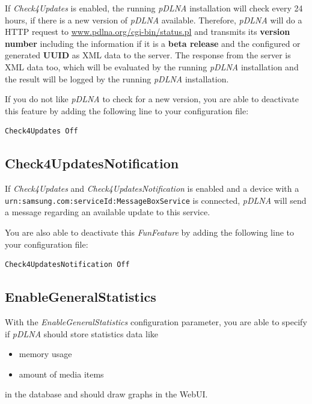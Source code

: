 \documentclass[a4paper,oneside,10pt]{report}
\newenvironment{colframefile}{%
  \begin{Sbox}
    \begin{minipage}{.99\columnwidth}
}{%
  \end{minipage}
  \end{Sbox}
  \begin{center}
    \fcolorbox{black}{Yellow}{\TheSbox}
  \end{center}
}
\begin{document}
If {\em Check4Updates} is enabled, the running {\em pDLNA} installation will check every 24 hours, if there is a new version of {\em pDLNA} available. Therefore, {\em pDLNA} will do a HTTP request to \url{www.pdlna.org/cgi-bin/status.pl} and transmits its \textbf{version number} including the information if it is a \textbf{beta release} and the configured or generated \textbf{UUID} as XML data to the server. The response from the server is XML data too, which will be evaluated by the running {\em pDLNA} installation and the result will be logged by the running {\em pDLNA} installation.

If you do not like {\em pDLNA} to check for a new version, you are able to deactivate this feature by adding the following line to your configuration file:

\begin{colframefile}
\begin{verbatim}
Check4Updates Off
\end{verbatim}
\end{colframefile}

\subsection{Check4UpdatesNotification}
\label{config-check4updatesnotification}

If {\em Check4Updates} and {\em Check4UpdatesNotification} is enabled and a device with a \verb|urn:samsung.com:serviceId:MessageBoxService| is connected, {\em pDLNA} will send a message regarding an available update to this service.

You are also able to deactivate this {\em FunFeature} by adding  the following line to your configuration file:

\begin{colframefile}
\begin{verbatim}
Check4UpdatesNotification Off
\end{verbatim}
\end{colframefile}

\subsection{EnableGeneralStatistics}
\label{config-enablegeneralstatistics}

With the {\em EnableGeneralStatistics} configuration parameter, you are able to specify if {\em pDLNA} should store statistics data like
\begin{itemize}
	\item memory usage
	\item amount of media items
\end{itemize}
in the database and should draw graphs in the WebUI.
\end{document}
